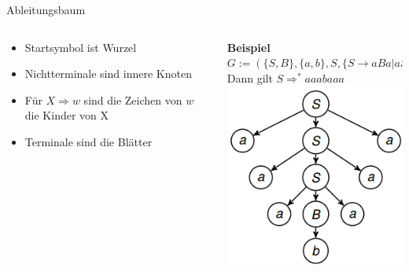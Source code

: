\documentclass[]{beamer}
\begin{document}
\begin{frame}{Ableitungsbaum}
	\begin{columns}
		\begin{column}{0.5\textwidth}
			\begin{itemize}
				\item Startsymbol ist Wurzel
				\item Nichtterminale sind innere Knoten
				\item Für $X \Rightarrow w $ sind die Zeichen von $w$ die Kinder von X
				\item Terminale sind die Blätter
			\end{itemize}
		\end{column}
		
		\begin{column}{0.5\textwidth}\bp
			\textbf{Beispiel}\\
			$G:= (\{S,B\}, \{a,b\}, S, \{S \rightarrow aBa|aSa, B \rightarrow b\})$\bp\\
			Dann gilt $S \Rightarrow^* aaabaaa$\\
			\center \includegraphics[scale=0.7]{images/Ableitungsbaum.png}
		\end{column}
	\end{columns}
	
\end{frame}
\end{document}

